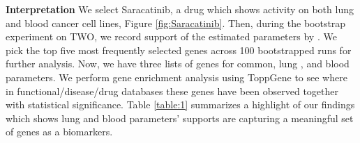 {\bf Interpretation}
We select Saracatinib, a drug which shows activity on both lung and blood cancer cell lines, Figure \ref{fig:Saracatinib}. 
Then, during the bootstrap experiment on TWO, we record support of the estimated parameters by \dc. 
We pick the top five most frequently selected genes across 100 bootstrapped runs for further analysis. 
Now, we have three lists of genes for common, lung , and blood parameters. 
We perform gene enrichment analysis using ToppGene \cite{chen09toppgene} to see where in functional/disease/drug databases these genes have been observed together with statistical significance. 
Table \ref{table:1} summarizes a highlight of our findings which shows lung and blood parameters' supports are capturing a meaningful set of genes as a biomarkers.%

